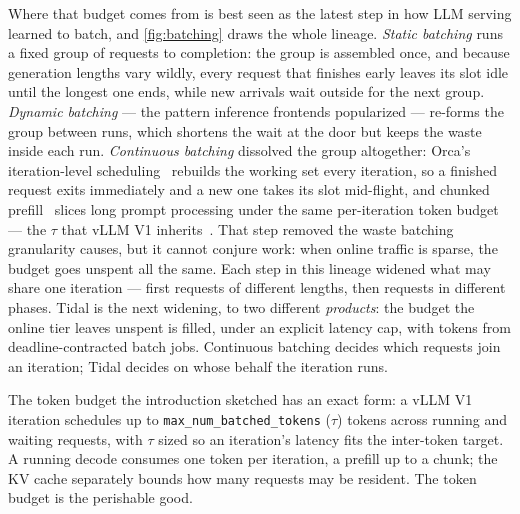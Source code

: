 \documentclass[11pt]{article}
\newcommand{\code}[1]{\texttt{#1}}
\begin{document}
Where that budget comes from is best seen as the latest step in how LLM serving
learned to batch, and \cref{fig:batching} draws the whole lineage. \emph{Static
batching} runs a fixed group of requests to completion: the group is assembled once,
and because generation lengths vary wildly, every request that finishes early leaves
its slot idle until the longest one ends, while new arrivals wait outside for the next
group. \emph{Dynamic batching} --- the pattern inference frontends popularized ---
re-forms the group between runs, which shortens the wait at the door but keeps the
waste inside each run. \emph{Continuous batching} dissolved the group altogether:
Orca's iteration-level scheduling~\citep{orca} rebuilds the working set every
iteration, so a finished request exits immediately and a new one takes its slot
mid-flight, and chunked prefill~\citep{sarathi} slices long prompt processing under the
same per-iteration token budget --- the $\tau$ that vLLM V1
inherits~\citep{vllm,sarathi}. That step removed the waste batching granularity
causes, but it cannot conjure work: when online traffic is sparse, the budget goes
unspent all the same. Each step in this lineage widened what may share one iteration
--- first requests of different lengths, then requests in different phases. Tidal is
the next widening, to two different \emph{products}: the budget the online tier leaves
unspent is filled, under an explicit latency cap, with tokens from deadline-contracted
batch jobs. Continuous batching decides which requests join an iteration; Tidal
decides on whose behalf the iteration runs.



The token budget the introduction sketched has an exact form: a vLLM V1 iteration
schedules up to \code{max\_num\_batched\_tokens} ($\tau$) tokens across running and
waiting requests, with $\tau$ sized so an iteration's latency fits the inter-token
target. A running decode consumes one token per iteration, a prefill up to a chunk; the
KV cache separately bounds how many requests may be resident. The token budget is the
perishable good.
\end{document}
